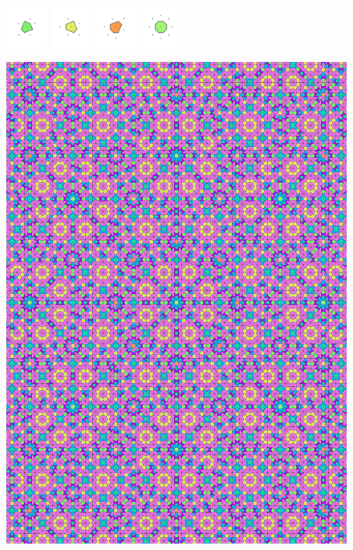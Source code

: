 \documentclass[text.tex]{subfiles}
\begin{document}
\begin{figure}[h!]
\includegraphics[width=0.12\textwidth]{img/results/circle8/circle8_181334_(4721_-1954alpha_2)_005.pdf}
\includegraphics[width=0.12\textwidth]{img/results/circle8/circle8_181334_(4721_-1954alpha_2)_006.pdf}
\includegraphics[width=0.12\textwidth]{img/results/circle8/circle8_181334_(4721_-1954alpha_2)_007.pdf}
\includegraphics[width=0.12\textwidth]{img/results/circle8/circle8_181334_(4721_-1954alpha_2)_008.pdf}
\end{figure}

\begin{figure}[h!]
\centering
\includegraphics[width=1\textwidth]{img/results/circle8/quasi_circle_181334_(4721_-1954alpha_2).pdf}
\end{figure}
\end{document}
